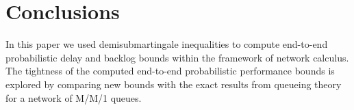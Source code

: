 \documentclass[letterpaper]{IEEEtran}
\begin{document}
\section{Conclusions}
\label{sec:conclusion}
In this paper we used demisubmartingale inequalities to compute end-to-end probabilistic delay and backlog bounds within the framework of network calculus. The tightness of the computed end-to-end probabilistic performance bounds is explored by comparing new bounds with the exact results from queueing theory for a network of M/M/1 queues.


\end{document}

